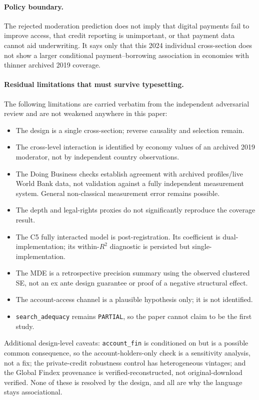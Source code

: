 \paragraph{Policy boundary.} The rejected moderation prediction does not imply that digital
payments fail to improve access, that credit reporting is unimportant, or that payment data
cannot aid underwriting. It says only that this 2024 individual cross-section does not show
a larger conditional payment--borrowing association in economies with thinner archived 2019
coverage.

\paragraph{Residual limitations that must survive typesetting.} The following limitations
are carried verbatim from the independent adversarial review and are not weakened anywhere
in this paper:
\begin{itemize}
\item The design is a single cross-section; reverse causality and selection remain.
\item The cross-level interaction is identified by \NEconomies{} economy values of an
archived 2019 moderator, not by \NAdults{} independent country observations.
\item The Doing Business checks establish agreement with archived profiles/live World Bank
data, not validation against a fully independent measurement system. General non-classical
measurement error remains possible.
\item The depth and legal-rights proxies do not significantly reproduce the coverage result.
\item The C5 fully interacted model is post-registration. Its coefficient is
dual-implementation; its within-$R^2$ diagnostic is persisted but single-implementation.
\item The MDE is a retrospective precision summary using the observed clustered SE, not an
ex ante design guarantee or proof of a negative structural effect.
\item The account-access channel is a plausible hypothesis only; it is not identified.
\item \texttt{search\_adequacy} remains \texttt{PARTIAL}, so the paper cannot claim to be
the first study.
\end{itemize}
Additional design-level caveats: \texttt{account\_fin} is conditioned on but is a possible
common consequence, so the account-holders-only check is a sensitivity analysis, not a fix;
the private-credit robustness control has heterogeneous vintages; and the Global Findex
provenance is verified-reconstructed, not original-download verified. None of these is
resolved by the design, and all are why the language stays associational.

